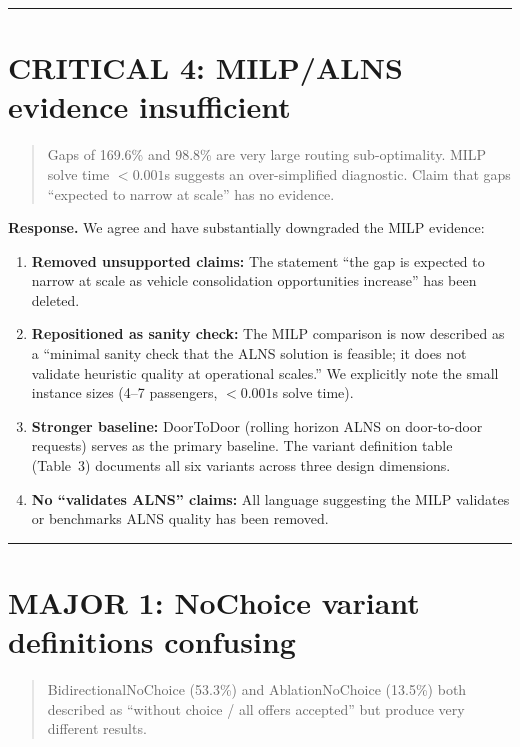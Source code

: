\documentclass[12pt]{article}
\newenvironment{revcomment}{%
  \begin{quote}\itshape
}{%
  \end{quote}
}
\begin{document}
\bigskip\hrule\bigskip

\section*{CRITICAL 4: MILP/ALNS evidence insufficient}

\begin{revcomment}
Gaps of 169.6\% and 98.8\% are very large routing sub-optimality. MILP solve time $<0.001$s suggests an over-simplified diagnostic. Claim that gaps ``expected to narrow at scale'' has no evidence.
\end{revcomment}

\textbf{Response.} We agree and have substantially downgraded the MILP evidence:

\begin{enumerate}
  \item \textbf{Removed unsupported claims:} The statement ``the gap is expected to narrow at scale as vehicle consolidation opportunities increase'' has been deleted.

  \item \textbf{Repositioned as sanity check:} The MILP comparison is now described as a ``minimal sanity check that the ALNS solution is feasible; it does not validate heuristic quality at operational scales.'' We explicitly note the small instance sizes (4--7 passengers, $<0.001$s solve time).

  \item \textbf{Stronger baseline:} DoorToDoor (rolling horizon ALNS on door-to-door requests) serves as the primary baseline. The variant definition table (Table~3) documents all six variants across three design dimensions.

  \item \textbf{No ``validates ALNS'' claims:} All language suggesting the MILP validates or benchmarks ALNS quality has been removed.
\end{enumerate}

\bigskip\hrule\bigskip

\section*{MAJOR 1: NoChoice variant definitions confusing}

\begin{revcomment}
BidirectionalNoChoice (53.3\%) and AblationNoChoice (13.5\%) both described as ``without choice / all offers accepted'' but produce very different results.
\end{revcomment}
\end{document}
